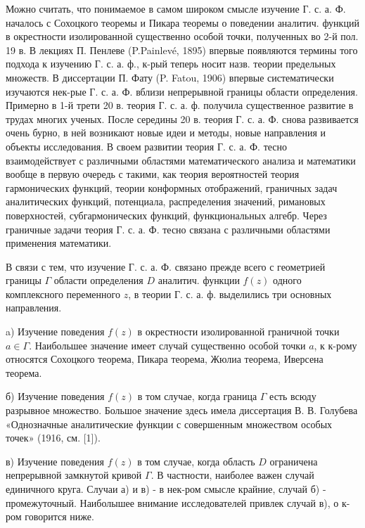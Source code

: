 \documentclass[10pt]{article}
\begin{document}
Можно считать, что понимаемое в самом широком смысле изучение Г. с. а. Ф. началось с Сохоцкого теоремы и Пикара теоремы о поведении аналитич. функций в окрестности изолированной существенно особой точки, полученных во 2-й пол. 19 в. В лекциях П. Пенлеве (P.Painlevé, 1895) впервые появляются термины того подхода к изучению Г. с. а. ф., к-рый теперь носит назв. теории предельных множеств. В диссертации П. Фату (P. Fatou, 1906) впервые систематически изучаются нек-рые $Г$. с. а. Ф. вблизи непрерывной границы области определения. Примерно в 1-й трети 20 в. теория Г. с. а. ф. получила существенное развитие в трудах многих ученых. После середины 20 в. теория Г. с. а. Ф. снова развивается очень бурно, в ней возникают новые идеи и методы, новые направления и объекты исследования. В своем развитии теория Г. с. а. Ф. тесно взаимодействует с различными областями математического анализа и математики вообще в первую очередь с такими, как теория вероятностей теория гармонических функций, теории конформных отображений, граничных задач аналитических функций, потенциала, распределения значений, римановых поверхностей, субгармонических функций, функциональных алгебр. Через граничные задачи теория Г. с. а. Ф. тесно связана с различными областями применения математики.



В связи с тем, что изучение Г. с. а. Ф. связано прежде всего с геометрией границы $\Gamma$ области определения $D$ аналитич. функции $f(z)$ одного комплексного переменного $z$, в теории Г. с. а. ф. выделились три основных направления.



a) Изучение поведения $f(z)$ в окрестности изолированной граничной точки $a \in \Gamma$. Наибольшее значение имеет случай существенно особой точки $a$, к к-рому относятся Сохоцкого теорема, Пикара теорема, Жюлиа теорема, Иверсена теорема.



б) Изучение поведения $f(z)$ в том случае, когда граница $\Gamma$ есть всюду разрывное множество. Большое значение здесь имела диссертация В. В. Голубева «Однозначные аналитические функции с совершенным множеством особых точек» (1916, см. [1]).



в) Изучение поведения $f(z)$ в том случае, когда область $D$ ограничена непрерывной замкнутой кривой $\Gamma$. В частности, наиболее важен случай единичного круга. Случаи а) и в) - в нек-ром смысле крайние, случай б) - промежуточный. Наиболышее внимание исследователей привлек случай в), о к-ром говорится ниже.
\end{document}
